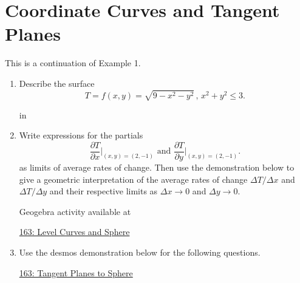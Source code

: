 \documentclass{ximera}
\newcommand{\pskip}{\vskip 0.1 in}
\begin{document}
\section{Coordinate Curves and Tangent Planes}


\begin{example}  \label{Esdtr435r}
This is a continuation of Example 1. 

\begin{enumerate}

\item Describe the surface
\[
  T = f(x,y) = \sqrt{9-x^2-y^2} \, , \, x^2 + y^2 \leq 3 .
\]

\pskip

\item Write expressions  for the partials
\[
    \frac{\partial T}{\partial x}\Big|_{(x,y)=(2,-1)} \text{ and } \frac{\partial T}{\partial y}\Big|_{(x,y)=(2,-1)} .
\]
as limits of average rates of change. Then use the demonstration below to give a geometric interpretation of the average rates of change $\Delta T/\Delta x$ and $\Delta T/\Delta y$ and their respective limits as $\Delta x\to 0$ and $\Delta y\to 0$.

 
\begin{onlineOnly}
    \begin{center}
\end{center}
\end{onlineOnly}

Geogebra activity available at

\href{https://www.geogebra.org/classic/egnkjkqw}{163: Level Curves and Sphere}




\item Use the desmos demonstration below for the following questions. 

\begin{onlineOnly}
    \begin{center}
\end{center}
\end{onlineOnly}

\href{https://www.desmos.com/3d/967c10cbdc}{163: Tangent Planes to Sphere}

\begin{enumerate}


\end{enumerate}
\end{enumerate}
\end{example}
\end{document}
